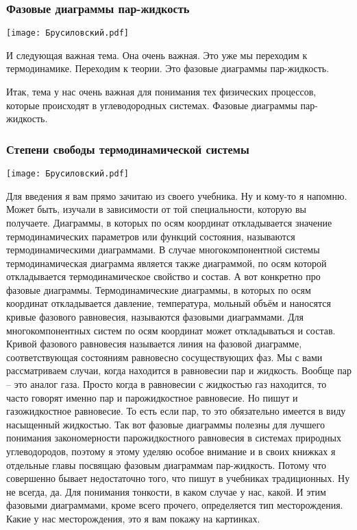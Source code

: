 \documentclass[main.tex]{subfiles}
\begin{document}
\subsubsection{Фазовые диаграммы пар-жидкость}

\begin{center}
\texttt{[image: Брусиловский.pdf]}
\end{center}

И следующая важная тема.
Она очень важная.
Это уже мы переходим к термодинамике.
Переходим к теории.
Это фазовые диаграммы пар-жидкость.

Итак, тема у нас очень важная для понимания тех физических процессов, которые происходят в углеводородных системах.
Фазовые диаграммы пар-жидкость.

\subsubsection{Степени свободы термодинамической системы}

\begin{center}
\texttt{[image: Брусиловский.pdf]}
\end{center}

Для введения я вам прямо зачитаю из своего учебника.
Ну и кому-то я напомню.
Может быть, изучали в зависимости от той специальности, которую
вы получаете.
Диаграммы, в которых по осям координат откладывается значение термодинамических параметров или функций состояния, называются термодинамическими диаграммами.
В случае многокомпонентной системы термодинамическая диаграмма является также диаграммой, по осям которой откладывается термодинамическое свойство и состав.
А вот конкретно про фазовые диаграммы.
Термодинамические диаграммы, в которых по осям координат откладывается давление, температура, мольный объём и наносятся кривые фазового равновесия, называются фазовыми диаграммами.
Для многокомпонентных систем по осям координат может откладываться и состав.
Кривой фазового равновесия называется линия на фазовой диаграмме, соответствующая состояниям равновесно сосуществующих фаз.
Мы с вами рассматриваем случаи, когда находится в равновесии пар и жидкость.
Вообще пар -- это аналог газа.
Просто когда в равновесии с жидкостью газ находится, то часто говорят именно пар и парожидкостное равновесие.
Но пишут и газожидкостное равновесие.
То есть если пар, то это обязательно имеется в виду насыщенный жидкостью.
Так вот фазовые диаграммы полезны для лучшего понимания закономерности парожидкостного равновесия в системах природных углеводородов, поэтому я этому уделяю особое внимание и в своих книжках я отдельные главы посвящаю фазовым диаграммам пар-жидкость.
Потому что совершенно бывает недостаточно того, что пишут в учебниках традиционных.
Ну не всегда, да.
Для понимания тонкости, в каком случае у нас, какой.
И этим фазовыми диаграммами, кроме всего прочего, определяется тип месторождения.
Какие у нас месторождения, это я вам покажу на картинках.
\end{document}
